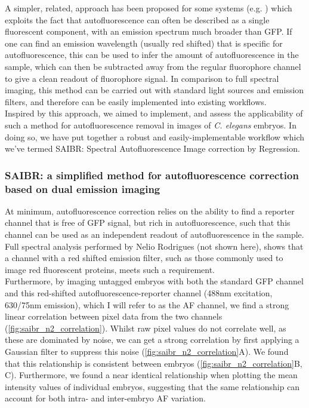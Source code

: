 \documentclass[12pt]{"article"}
\begin{document}
A simpler, related, approach has been proposed for some systems (e.g. \cite{Roederer1986}) which exploits the fact that autofluorescence can often be described as a single fluorescent component, with an emission spectrum much broader than GFP. If one can find an emission wavelength (usually red shifted) that is specific for autofluorescence, this can be used to infer the amount of autofluorescence in the sample, which can then be subtracted away from the regular fluorophore channel to give a clean readout of fluorophore signal. In comparison to full spectral imaging, this method can be carried out with standard light sources and emission filters, and therefore can be easily implemented into existing workflows.\\

Inspired by this approach, we aimed to implement, and assess the applicability of such a method for autofluorescence removal in images of \textit{C. elegans} embryos. In doing so, we have put together a robust and easily-implementable workflow which we’ve termed SAIBR: Spectral Autofluorescence Image correction by Regression.\\


\subsubsection{SAIBR: a simplified method for autofluorescence correction based on dual emission imaging}


At minimum, autofluorescence correction relies on the ability to find a reporter channel that is free of GFP signal, but rich in autofluorescence, such that this channel can be used as an independent readout of autofluorescence in the sample. Full spectral analysis performed by Nelio Rodrigues (not shown here), shows that a channel with a red shifted emission filter, such as those commonly used to image red fluorescent proteins, meets such a requirement.\\

Furthermore, by imaging untagged embryos with both the standard GFP channel and this red-shifted autofluorescence-reporter channel (488nm excitation, 630/75nm emission), which I will refer to as the AF channel, we find a strong linear correlation between pixel data from the two channels (\cref{fig:saibr_n2_correlation}). Whilst raw pixel values do not correlate well, as these are dominated by noise, we can get a strong correlation by first applying a Gaussian filter to suppress this noise (\cref{fig:saibr_n2_correlation}A). We found that this relationship is consistent between embryos (\cref{fig:saibr_n2_correlation}B, C). Furthermore, we found a near identical relationship when plotting the mean intensity values of individual embryos, suggesting that the same relationship can account for both intra- and inter-embryo AF variation. \\
\end{document}
